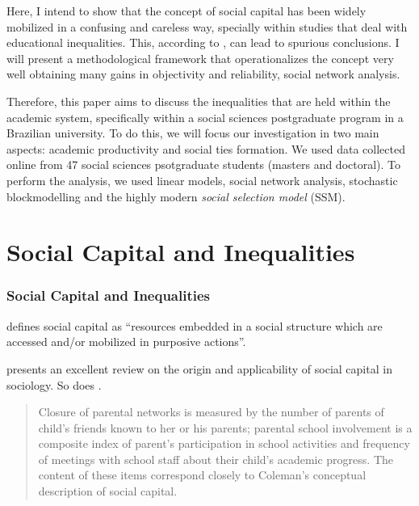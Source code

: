 \documentclass[compress]{beamer}
\begin{document}
\begin{frame}
\justify

  Here, I intend to show that the concept of social capital has been widely mobilized in a confusing and careless way, specially within studies that deal with educational inequalities. This, according to , can lead to spurious conclusions. I will present a methodological framework that operationalizes the concept very well obtaining many gains in objectivity and reliability, social network analysis.
  
  \vspace{3mm}
  
  Therefore, this paper aims to discuss the inequalities that are held within the academic system, specifically within a social sciences postgraduate program in a Brazilian university. To do this, we will focus our investigation in two main aspects: academic productivity and social ties formation. We used data collected online from 47 social sciences psotgraduate students (masters and doctoral). To perform the analysis, we used linear models, social network analysis, stochastic blockmodelling and the highly modern \textit{social selection model} (SSM).
    
\end{frame}

\section{Social Capital and Inequalities}
\begin{frame}
	\frametitle{Social Capital and Inequalities}
	\justify
	
	 defines social capital as ``resources embedded in a social structure which are accessed and/or mobilized in purposive actions''.
	
	\vspace{3mm}
	
	 presents an excellent review on the origin and applicability of social capital in sociology. So does .
	
	\vspace{3mm}
	
	\begin{quote}
		\footnotesize
		Closure of parental networks is measured by the number of parents of child's friends known to her or his parents; parental school involvement is a composite index of parent's participation in school activities and frequency of meetings with school staff about their child's academic progress. The content of these items correspond closely to Coleman's conceptual description of social capital. \cite[p. 7]{portes2000two}
	\end{quote}
	
\end{frame}
\end{document}
